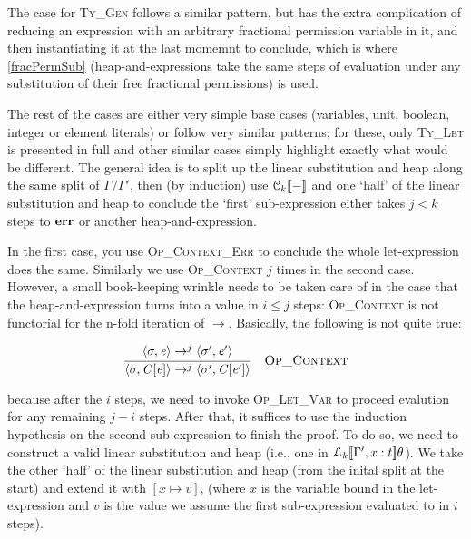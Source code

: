 The case for \textsc{Ty\_Gen} follows a similar pattern, but has the extra
complication of reducing an expression with an arbitrary fractional permission
variable in it, and then instantiating it at the last momemnt to conclude,
which is where \ref{fracPermSub} (heap-and-expressions take the same steps of
evaluation under any substitution of their free fractional permissions) is
used.

The rest of the cases are either very simple base cases (variables, unit,
boolean, integer or element literals) or follow very similar patterns; for
these, only \textsc{Ty\_Let} is presented in full and other similar cases
simply highlight exactly what would be different.  The general idea is to split
up the linear substitution and heap along the same split of $\Gamma/\Gamma'$,
then (by induction) use $\mathcal{C}_{k} [\![ - ]\!]$ and one `half' of the  linear substitution
and heap to conclude the `first' sub-expression either takes $j< k$ steps to
$\mathbf{err}$ or another heap-and-expression.

In the first case, you use \textsc{Op\_Context\_Err} to conclude the whole
let-expression does the same. Similarly we use \textsc{Op\_Context} $j$ times
in the second case. However, a small book-keeping wrinkle needs to be taken
care of in the case that the heap-and-expression turns into a value in $i \leq
j$ steps: \textsc{Op\_Context} is not functorial for the n-fold iteration of
$\rightarrow$.  Basically, the following is not quite true:

\vspace{-\baselineskip}
\[
\ottdrule{%
    \ottpremise{\langle  \sigma  \ottsym{,}  \ottnt{e}  \rangle  \rightarrow^j  \langle  \sigma'  \ottsym{,}  \ottnt{e'}  \rangle}%
    }{
    \langle  \sigma  \ottsym{,}  \ottnt{C}  \ottsym{[}  \ottnt{e}  \ottsym{]}  \rangle  \rightarrow^j  \langle  \sigma'  \ottsym{,}  \ottnt{C}  \ottsym{[}  \ottnt{e'}  \ottsym{]}  \rangle}{%
    {\ottdrulename{Op\_Context}}{}%
}
\]

because after the $i$ steps, we need to invoke \textsc{Op\_Let\_Var} to proceed
evalution for any remaining $j-i$ steps. After that, it suffices to use the
induction hypothesis on the second sub-expression to finish the proof.  To do
so, we need to construct a valid linear substitution and heap (i.e., one in
$\mathcal{L}_{k} [\![ \Gamma', x : t ]\!]\theta$). We take the other `half' of the linear
substitution and heap (from the inital split at the start) and extend it with
$[x \mapsto v]$, (where $x$ is the variable bound in the let-expression and $v$
is the value we assume the first sub-expression evaluated to in $i$ steps).

